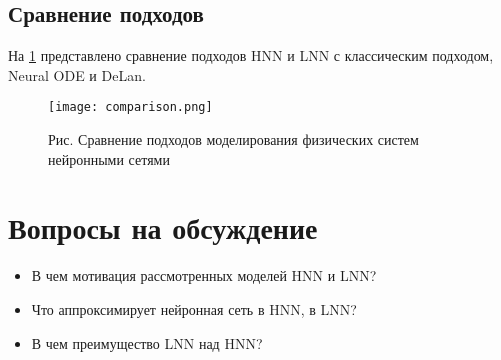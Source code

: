 \subsection{Сравнение подходов}
На \ref{comparison} представлено сравнение подходов HNN и LNN с классическим подходом, Neural ODE и DeLan.
\begin{figure}[h]
	\centering
	\texttt{[image: comparison.png]}
	\label{comparison}
	\caption{Рис. Сравнение подходов моделирования физических систем нейронными сетями}
\end{figure}


\section{Вопросы на обсуждение}

\begin{itemize}
	\item В чем мотивация рассмотренных моделей HNN и LNN?
	\item Что аппроксимирует нейронная сеть в HNN, в LNN?
	\item В чем преимущество LNN над HNN? 
\end{itemize}